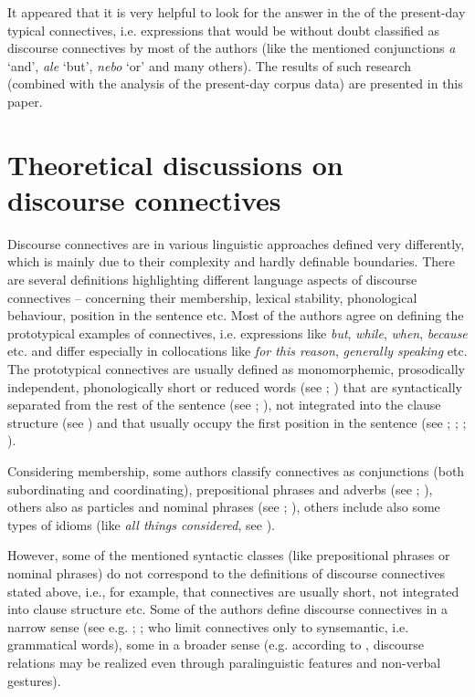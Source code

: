 \documentclass[output=paper]{langsci/langscibook.cls}
\begin{document}
It appeared that it is very helpful to look for the answer in the  of the present-day typical connectives, i.e. expressions that would be without doubt classified as discourse connectives by most of the authors (like the mentioned conjunctions \textit{a} `and', \textit{ale }`but', \textit{nebo} `or' and many others). The results of such research (combined with the analysis of the present-day corpus data) are presented in this paper.

\section{Theoretical discussions on discourse connectives}

Discourse connectives are in various linguistic approaches defined very differently, which is mainly due to their complexity and hardly definable boundaries. There are several definitions highlighting different language aspects of discourse connectives – concerning their  membership, lexical stability, pho\-no\-logical behaviour, position in the sentence etc. Most of the authors agree on defining the prototypical examples of connectives, i.e. expressions like \textit{but}, \textit{while}, \textit{when}, \textit{because} etc. and differ especially in  collocations like \textit{for this reason}, \textit{generally speaking} etc. The prototypical connectives are usually defined as monomorphemic, prosodically independent, phonologically short or reduced words (see 
\citealt{zwicky1985clitics}; \citealt{urgelles2010syntax}) that are syntactically separated from the rest of the sentence (see \citealt{deborah1987discourse}; \citealt{zwicky1985clitics}), not integrated into the clause structure (see \citealt{urgelles2010syntax}) and that usually occupy the first position in the sentence (see \citealt{deborah1987discourse}; \citealt{zwicky1985clitics}; \citealt{schourup1999discourse}; \citealt{fischer2006approaches}).

Considering  membership, some authors classify connectives as conjunctions (both subordinating and coordinating), prepositional phrases and adverbs (see \citealt{prasad2008penn}; \citealt{prasad2010realization}), others also as particles and nominal phrases (see \citealt{hansen1998function}; \citealt{aijmer2002english}), others include also some types of idioms (like \textit{all things considered}, see \citealt{fraser1999discourse}).

However, some of the mentioned syntactic classes (like prepositional phrases or nominal phrases) do not correspond to the definitions of discourse connectives stated above, i.e., for example, that connectives are usually short, not integrated into clause structure etc. Some of the authors define discourse connectives in a narrow sense (see e.g. \citealt{shloush1998unified}; \citealt{hakulinen1998use}; \citealt{maschler2000discourse} who limit connectives only to synsemantic, i.e. grammatical words), some in a broader sense (e.g. according to \citealt{deborah1987discourse}, discourse relations may be realized even through paralinguistic features and non-verbal gestures). 
\end{document}
